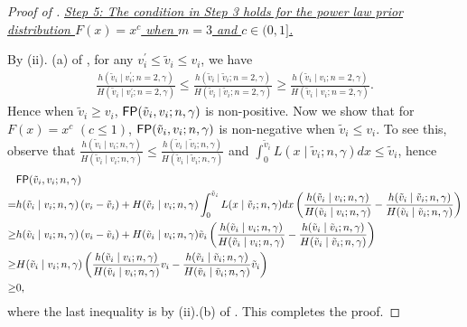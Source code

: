 \begin{proof}[Proof of ]
\medskip

\noindent\textit{\underline{Step 5: The condition in Step 3 holds for the power law prior distribution $F(x)=x^c$ when $m=3$ and $c\in (0,1]$.}}

\medskip

\noindent By (ii). (a) of , for any $v_i^\prime\leq \tilde{v}_i\leq v_i$, we have
\begin{align*}  \frac{h(\tilde{v}_i\mid v_i^\prime;n=2,\gamma)}{H(\tilde{v}_i\mid v_i^\prime;n=2,\gamma)} 
\leq \frac{h(\tilde{v}_i\mid \tilde{v}_i;n=2,\gamma)}{H(\tilde{v}_i\mid \tilde{v}_i;n=2,\gamma)} 
\geq 
 \frac{h(\tilde{v}_i\mid v_i;n=2,\gamma)}{H(\tilde{v}_i\mid v_i;n=2,\gamma)}.
\end{align*}
Hence when $\tilde{v}_i \geq v_i$, $\mathsf{FP}(\tilde{v}_i,v_i;n,\gamma) $ is non-positive. Now we show that for $F(x) = x^c$ $(c\leq 1)$, $\mathsf{FP}(\tilde{v}_i,v_i;n,\gamma) $ is non-negative when $\tilde{v}_i \leq v_i$. To see this, observe that $\frac{h(\tilde{v}_i\mid v_i;n,\gamma)}{H(\tilde{v}_i\mid v_i;n,\gamma)}  \leq \frac{h(\tilde{v}_i\mid \tilde{v}_i;n,\gamma)}{H(\tilde{v}_i\mid \tilde{v}_i;n,\gamma)}$ and $\int_0^{\tilde{v}_i}L(x\mid \tilde{v}_i;n,\gamma)dx \leq \tilde{v}_i$, hence 
\begin{align*}
  &\mathsf{FP}(\tilde{v}_i,v_i;n,\gamma)\\  =&h(\tilde{v}_i\mid v_i;n,\gamma)  \left(v_i - \tilde{v}_i\right)
 +H(\tilde{v}_i\mid v_i;n,\gamma)  \int_0^{\tilde{v}_i}L(x\mid \tilde{v}_i;n,\gamma)dx
   \left(
 \frac{h(\tilde{v}_i\mid v_i;n,\gamma)}{H(\tilde{v}_i\mid v_i;n,\gamma)}  - \frac{h(\tilde{v}_i\mid \tilde{v}_i;n,\gamma)}{H(\tilde{v}_i\mid \tilde{v}_i;n,\gamma)}
 \right) \\
 \geq & h(\tilde{v}_i\mid v_i;n,\gamma)  \left(v_i - \tilde{v}_i\right)
 +H(\tilde{v}_i\mid v_i;n,\gamma) \tilde{v}_i \left(
 \frac{h(\tilde{v}_i\mid v_i;n,\gamma)}{H(\tilde{v}_i\mid v_i;n,\gamma)}  - \frac{h(\tilde{v}_i\mid \tilde{v}_i;n,\gamma)}{H(\tilde{v}_i\mid \tilde{v}_i;n,\gamma)}
 \right) \\
 \geq & H(\tilde{v}_i\mid v_i;n,\gamma) \left( \frac{h(\tilde{v}_i\mid {v}_i;n,\gamma)}{H(\tilde{v}_i\mid {v}_i;n,\gamma)}{v}_i -  \frac{h(\tilde{v}_i\mid \tilde{v}_i;n,\gamma)}{H(\tilde{v}_i\mid \tilde{v}_i;n,\gamma)}\tilde{v}_i\right)\\
 \geq & 0,
\end{align*}
where the last inequality is by (ii).(b) of . This completes the proof.
\noindent 
\end{proof}

